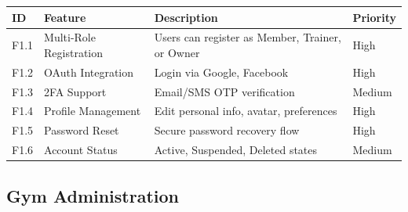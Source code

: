 \documentclass[
  12pt,
  a4paperpaper,
]{report}
\newcounter{none} %
\begin{document}
{\def\LTcaptype{none} %
\begin{longtable}[]{@{}
  >{\raggedright\arraybackslash}p{}
  >{\raggedright\arraybackslash}p{}
  >{\raggedright\arraybackslash}p{}
  >{\raggedright\arraybackslash}p{}@{}}
\hline
\begin{minipage}[b]{\linewidth}\raggedright
ID
\end{minipage} & \begin{minipage}[b]{\linewidth}\raggedright
Feature
\end{minipage} & \begin{minipage}[b]{\linewidth}\raggedright
Description
\end{minipage} & \begin{minipage}[b]{\linewidth}\raggedright
Priority
\end{minipage} \\
\hline
\endhead
\hline
\endlastfoot
F1.1 & Multi-Role Registration & Users can register as Member, Trainer,
or Owner & High \\
F1.2 & OAuth Integration & Login via Google, Facebook & High \\
F1.3 & 2FA Support & Email/SMS OTP verification & Medium \\
F1.4 & Profile Management & Edit personal info, avatar, preferences &
High \\
F1.5 & Password Reset & Secure password recovery flow & High \\
F1.6 & Account Status & Active, Suspended, Deleted states & Medium \\
\end{longtable}
}

\subsection{Gym Administration}\label{gym-administration}
\end{document}
